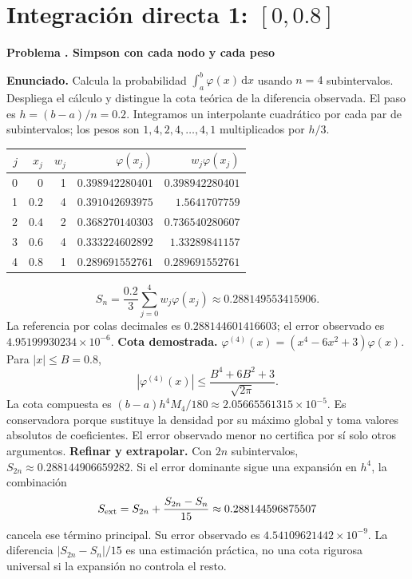 \documentclass[11pt,a4paper]{article}
\newcommand{\dd}{\,\mathrm d}
\theoremstyle{definition}
\newcounter{problema}
\newenvironment{resuelto}[1]{\refstepcounter{problema}\par\medskip\Needspace{6\baselineskip}\textbf{Problema \theproblema. #1}\par}{\par\medskip}
\begin{document}
\section{\texorpdfstring{Integración directa 1: $[0,0.8]$}{Integración directa 1: [0,0.8]}}
\begin{resuelto}{Simpson con cada nodo y cada peso}
\textbf{Enunciado.} Calcula la probabilidad $\int_a^b\varphi(x)\dd x$ usando $n=4$ subintervalos. Despliega el cálculo y distingue la cota teórica de la diferencia observada.
El paso es $h=(b-a)/n=0.2$. Integramos un interpolante cuadrático por cada par de subintervalos; los pesos son $1,4,2,4,\ldots,4,1$ multiplicados por $h/3$.

\begin{center}\small\begin{tabular}{rrrrr}
\toprule
$j$&$x_j$&$w_j$&$\varphi(x_j)$&$w_j\varphi(x_j)$\\
\midrule
0&$0$&1&$0.398942280401$&$0.398942280401$\\
1&$0.2$&4&$0.391042693975$&$1.5641707759$\\
2&$0.4$&2&$0.368270140303$&$0.736540280607$\\
3&$0.6$&4&$0.333224602892$&$1.33289841157$\\
4&$0.8$&1&$0.289691552761$&$0.289691552761$\\
\bottomrule\end{tabular}\end{center}
\[
S_n=\frac{0.2}{3}\sum_{j=0}^{4}w_j\varphi(x_j)\approx0.288149553415906.
\]
La referencia por colas decimales es $0.288144601416603$; el error observado es $4.95199930234\times10^{-6}$.
\textbf{Cota demostrada.} $\varphi^{(4)}(x)=(x^4-6x^2+3)\varphi(x)$. Para $|x|\le B=0.8$,
\[
|\varphi^{(4)}(x)|\le\frac{B^4+6B^2+3}{\sqrt{2\pi}}.
\]
La cota compuesta es $(b-a)h^4M_4/180\approx2.05665561315\times10^{-5}$. Es conservadora porque sustituye la densidad por su máximo global y toma valores absolutos de coeficientes. El error observado menor no certifica por sí solo otros argumentos.
\textbf{Refinar y extrapolar.} Con $2n$ subintervalos, $S_{2n}\approx0.288144906659282$. Si el error dominante sigue una expansión en $h^4$, la combinación
\[
S_{\rm ext}=S_{2n}+\frac{S_{2n}-S_n}{15}\approx0.288144596875507
\]
cancela ese término principal. Su error observado es $4.54109621442\times10^{-9}$. La diferencia $|S_{2n}-S_n|/15$ es una estimación práctica, no una cota rigurosa universal si la expansión no controla el resto.
\end{resuelto}
\end{document}
